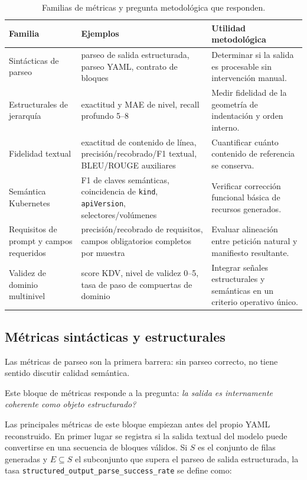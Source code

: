 \begin{table}[htbp]
\centering
\caption{Familias de métricas y pregunta metodológica que responden.}
\label{tab:ch4_metric_families}
\begin{tabular}{p{}p{}p{}}
\toprule
\textbf{Familia} & \textbf{Ejemplos} & \textbf{Utilidad metodológica} \\
\midrule
Sintácticas de parseo & parseo de salida estructurada, parseo YAML, contrato de bloques & Determinar si la salida es procesable sin intervención manual. \\
Estructurales de jerarquía & exactitud y MAE de nivel, recall profundo 5--8 & Medir fidelidad de la geometría de indentación y orden interno. \\
Fidelidad textual & exactitud de contenido de línea, precisión/recobrado/F1 textual, BLEU/ROUGE auxiliares & Cuantificar cuánto contenido de referencia se conserva. \\
Semántica Kubernetes & F1 de claves semánticas, coincidencia de \texttt{kind}, \texttt{apiVersion}, selectores/volúmenes & Verificar corrección funcional básica de
recursos generados. \\
Requisitos de prompt y campos requeridos & precisión/recobrado de requisitos, campos obligatorios completos por muestra & Evaluar alineación entre petición natural y
manifiesto resultante. \\
Validez de dominio multinivel & score KDV, nivel de validez 0--5, tasa de paso de compuertas de dominio & Integrar señales estructurales y semánticas en un criterio operativo único. \\
\bottomrule
\end{tabular}
\end{table}

\subsection{Métricas sintácticas y estructurales}
\label{sec:ch4_metrics_structural}

Las métricas de parseo son la primera barrera: sin parseo correcto, no tiene sentido discutir calidad semántica.

Este bloque de métricas responde a la pregunta: \textit{\textquestiondown la salida es internamente coherente como objeto estructurado?}

Las principales métricas de este bloque empiezan antes del propio YAML reconstruido. En primer lugar se registra si la salida textual del modelo puede convertirse en una secuencia
de bloques válidos. Si \(S\) es el conjunto de filas generadas y \(E \subseteq S\) el subconjunto que supera el parseo de salida estructurada, la tasa
\texttt{structured\_output\_parse\_success\_rate} se define como:

